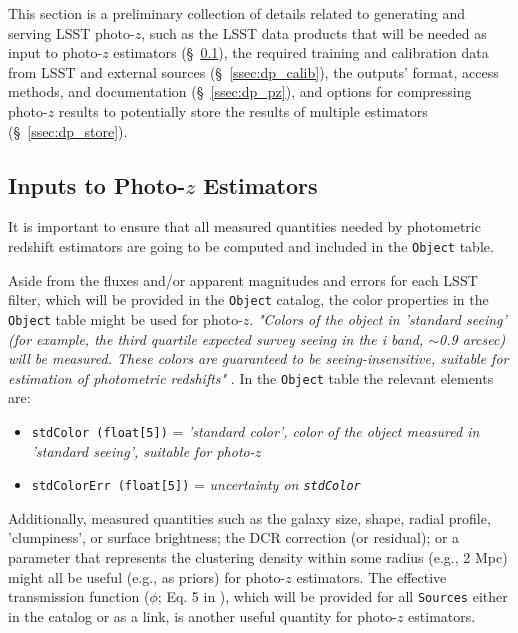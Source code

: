 \documentclass[DM,lsstdraft,toc]{lsstdoc}
\begin{document}
This section is a preliminary collection of details related to generating and serving LSST photo-$z$, such as the LSST data products that will be needed as input to photo-$z$ estimators (\S~\ref{ssec:dp_objvals}), the required training and calibration data from LSST and external sources (\S~\ref{ssec:dp_calib}), the outputs' format, access methods, and documentation (\S~\ref{ssec:dp_pz}), and options for compressing photo-$z$ results to potentially store the results of multiple estimators (\S~\ref{ssec:dp_store}).


\subsection{Inputs to Photo-$z$ Estimators}\label{ssec:dp_objvals}

It is important to ensure that all measured quantities needed by photometric redshift estimators are going to be computed and included in the {\tt Object} table. 

Aside from the fluxes and/or apparent magnitudes and errors for each LSST filter, which will be provided in the {\tt Object} catalog, the color properties in the {\tt Object} table might be used for photo-$z$. {\it "Colors of the object in 'standard seeing' (for example, the third quartile expected survey seeing in the i band, $\sim$0.9 arcsec) will be measured. These colors are guaranteed to be seeing-insensitive, suitable for estimation of photometric redshifts"} . In the {\tt Object} table the relevant elements are:
\vspace{-15pt}
\begin{itemize}
\item \texttt{stdColor (float[5])} = {\it 'standard color', color of the object measured in 'standard seeing', suitable for photo-$z$}
\item \texttt{stdColorErr (float[5])} = {\it uncertainty on \texttt{stdColor}}
\end{itemize}

Additionally, measured quantities such as the galaxy size, shape, radial profile, 'clumpiness', or surface brightness; the DCR correction (or residual); or a parameter that represents the clustering density within some radius (e.g., 2 Mpc) might all be useful (e.g., as priors) for photo-$z$ estimators. The effective transmission function ($\phi$; Eq. 5 in ), which will be provided for all {\tt Sources} either in the catalog or as a link, is another useful quantity for photo-$z$ estimators.
\end{document}
